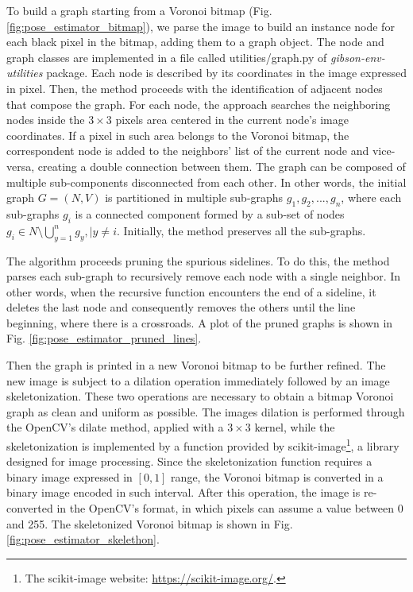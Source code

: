 To build a graph starting from a Voronoi bitmap (Fig. \ref{fig:pose_estimator_bitmap}), we parse the image to build an instance node for each black pixel in the bitmap, adding them to a graph object. The \textsf{node} and \textsf{graph} classes are implemented in a file called \textsf{utilities/graph.py} of \textit{gibson-env-utilities} package. Each node is described by its coordinates in the image expressed in pixel. Then, the method proceeds with the identification of adjacent nodes that compose the graph. For each node, the approach searches the neighboring nodes inside the $3 \times 3$ pixels area centered in the current node's image coordinates. If a pixel in such area belongs to the Voronoi bitmap, the correspondent node is added to the neighbors' list of the current node and vice-versa, creating a double connection between them. The graph can be composed of multiple sub-components disconnected from each other. In other words, the initial graph $G = (N, V)$ is partitioned in multiple sub-graphs $g_1, g_2, ..., g_n$, where each sub-graphs $g_i$ is a connected component formed by a sub-set of nodes $g_i \in N \setminus \bigcup_{y=1}^{n} g_{y}, \mid y  \neq i$. Initially, the method preserves all the sub-graphs. 

The algorithm proceeds pruning the spurious sidelines. To do this, the method parses each sub-graph to recursively remove each node with a single neighbor. In other words, when the recursive function encounters the end of a sideline, it deletes the last node and consequently removes the others until the line beginning, where there is a crossroads. A plot of the pruned graphs is shown in Fig. \ref{fig:pose_estimator_pruned_lines}. 

Then the graph is printed in a new Voronoi bitmap to be further refined. The new image is subject to a dilation operation immediately followed by an image skeletonization. These two operations are necessary to obtain a bitmap Voronoi graph as clean and uniform as possible. The images dilation is performed through the OpenCV's \textsf{dilate} method, applied with a $3 \times 3$ kernel, while the skeletonization is implemented by a function provided by scikit-image\footnote{The scikit-image website: \url{https://scikit-image.org/}.}, a library designed for image processing.
Since the skeletonization function requires a binary image expressed in $[0, 1]$ range, the Voronoi bitmap is converted in a binary image encoded in such interval. After this operation, the image is re-converted in the OpenCV's format, in which pixels can assume a value between 0 and 255. The skeletonized Voronoi bitmap is shown in Fig. \ref{fig:pose_estimator_skelethon}. 

